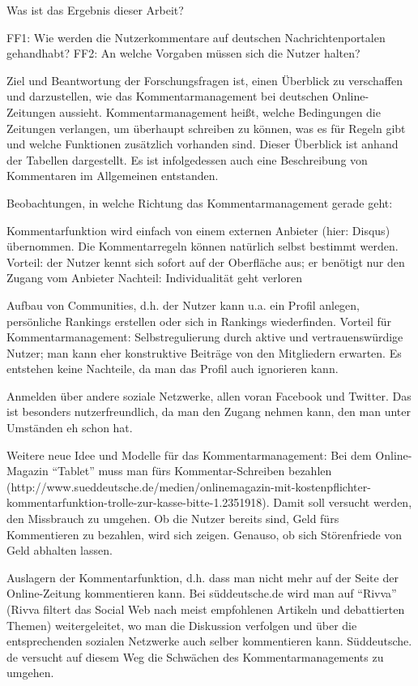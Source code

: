 Was ist das Ergebnis dieser Arbeit?

FF1: Wie werden die Nutzerkommentare auf deutschen Nachrichtenportalen
gehandhabt?
FF2: An welche Vorgaben müssen sich die Nutzer halten?

Ziel und Beantwortung der Forschungsfragen ist, einen Überblick zu verschaffen und darzustellen, wie das Kommentarmanagement bei deutschen Online-Zeitungen aussieht. Kommentarmanagement heißt, welche Bedingungen die Zeitungen verlangen, um überhaupt schreiben zu können, was es für Regeln gibt und welche Funktionen zusätzlich vorhanden sind. Dieser Überblick ist anhand der Tabellen dargestellt. 
Es ist infolgedessen auch eine Beschreibung von Kommentaren im Allgemeinen entstanden.



Beobachtungen, in welche Richtung das Kommentarmanagement gerade geht:

Kommentarfunktion wird einfach von einem externen Anbieter (hier: Disqus) übernommen. Die Kommentarregeln können natürlich selbst bestimmt werden. 
Vorteil: der Nutzer kennt sich sofort auf der Oberfläche aus; er benötigt nur den Zugang vom Anbieter
Nachteil: Individualität geht verloren


Aufbau von Communities, d.h. der Nutzer kann u.a. ein Profil anlegen, persönliche Rankings erstellen oder sich in Rankings wiederfinden.
Vorteil für Kommentarmanagement: Selbstregulierung durch aktive und vertrauenswürdige Nutzer; man kann eher konstruktive Beiträge von den Mitgliedern erwarten. Es entstehen keine Nachteile, da man das Profil auch ignorieren kann.
 

Anmelden über andere soziale Netzwerke, allen voran Facebook und Twitter. Das ist besonders nutzerfreundlich, da man den Zugang nehmen kann, den man unter Umständen eh schon hat. 




Weitere neue Idee und Modelle für das Kommentarmanagement:
Bei dem Online-Magazin ``Tablet'' muss man fürs Kommentar-Schreiben bezahlen (http://www.sueddeutsche.de/medien/onlinemagazin-mit-kostenpflichter-kommentarfunktion-trolle-zur-kasse-bitte-1.2351918).
Damit soll versucht werden, den Missbrauch zu umgehen. Ob die Nutzer bereits sind, Geld fürs Kommentieren zu bezahlen, wird sich zeigen. Genauso, ob sich Störenfriede von Geld abhalten lassen.


Auslagern der Kommentarfunktion, d.h. dass man nicht mehr auf der Seite der Online-Zeitung kommentieren kann. Bei süddeutsche.de wird man auf ``Rivva'' (Rivva filtert das Social Web nach meist empfohlenen Artikeln und debattierten Themen) weitergeleitet, wo man die Diskussion verfolgen und über die entsprechenden sozialen Netzwerke auch selber kommentieren kann. Süddeutsche. de versucht auf diesem Weg die Schwächen des Kommentarmanagements zu umgehen. 

